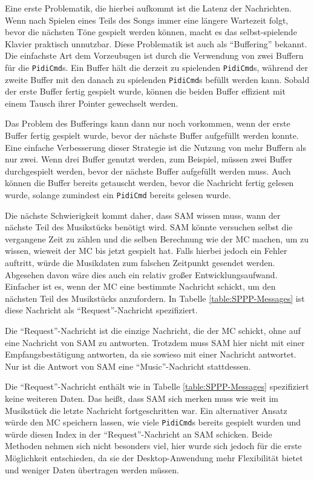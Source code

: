 Eine erste Problematik, die hierbei aufkommt ist die Latenz der Nachrichten.
Wenn nach Spielen eines Teils des Songs immer eine längere Wartezeit folgt, bevor die nächsten Töne gespielt werden können, macht es das selbst-spielende Klavier praktisch unnutzbar.
Diese Problematik ist auch als \enquote{Buffering} bekannt. %
Die einfachste Art dem Vorzeubugen ist durch die Verwendung von zwei Buffern für die \lstinline|PidiCmd|s.
Ein Buffer hält die derzeit zu spielenden \lstinline|PidiCmd|s, während der zweite Buffer mit den danach zu spielenden \lstinline|PidiCmd|s befüllt werden kann.
Sobald der erste Buffer fertig gespielt wurde, können die beiden Buffer effizient mit einem Tausch ihrer Pointer gewechselt werden.

Das Problem des Bufferings kann dann nur noch vorkommen, wenn der erste Buffer fertig gespielt wurde, bevor der nächste Buffer aufgefüllt werden konnte.
Eine einfache Verbesserung dieser Strategie ist die Nutzung von mehr Buffern als nur zwei.
Wenn drei Buffer genutzt werden, zum Beispiel, müssen zwei Buffer durchgespielt werden, bevor der nächste Buffer aufgefüllt werden muss.
Auch können die Buffer bereits getauscht werden, bevor die Nachricht fertig gelesen wurde, solange zumindest ein \lstinline|PidiCmd| bereits gelesen wurde.

Die nächste Schwierigkeit kommt daher, dass \ac{SAM} wissen muss, wann der nächste Teil des Musikstücks benötigt wird.
\ac{SAM} könnte versuchen selbst die vergangene Zeit zu zählen und die selben Berechnung wie der \ac{MC} machen, um zu wissen, wieweit der \ac{MC} bis jetzt gespielt hat.
Falls hierbei jedoch ein Fehler auftritt, würde die Musikdaten zum falschen Zeitpunkt gesendet werden.
Abgesehen davon wäre dies auch ein relativ großer Entwicklungsaufwand.
Einfacher ist es, wenn der \ac{MC} eine bestimmte Nachricht schickt, um den nächsten Teil des Musikstücks anzufordern.
In Tabelle \ref{table:SPPP-Messages} ist diese Nachricht als \enquote{Request}-Nachricht spezifiziert.

Die \enquote{Request}-Nachricht ist die einzige Nachricht, die der \ac{MC} schickt, ohne auf eine Nachricht von \ac{SAM} zu antworten.
Trotzdem muss \ac{SAM} hier nicht mit einer Empfangsbestätigung antworten, da sie sowieso mit einer Nachricht antwortet.
Nur ist die Antwort von \ac{SAM} eine \enquote{Music}-Nachricht stattdessen.

Die \enquote{Request}-Nachricht enthält wie in Tabelle \ref{table:SPPP-Messages} spezifiziert keine weiteren Daten.
Das heißt, dass \ac{SAM} sich merken muss wie weit im Musikstück die letzte Nachricht fortgeschritten war.
Ein alternativer Ansatz würde den \ac{MC} speichern lassen, wie viele \lstinline{PidiCmd}s bereits gespielt wurden und würde diesen Index in der \enquote{Request}-Nachricht an \ac{SAM} schicken.
Beide Methoden nehmen sich nicht besonders viel, hier wurde sich jedoch für die erste Möglichkeit entschieden, da sie der Desktop-Anwendung mehr Flexibilität bietet und weniger Daten übertragen werden müssen.

